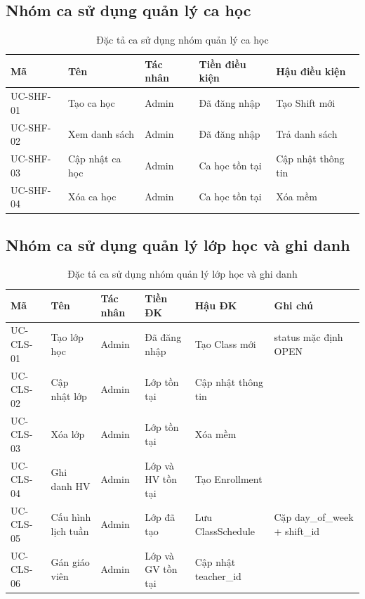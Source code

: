 \documentclass[../DoAn.tex]{subfiles}
\begin{document}
\subsection{Nhóm ca sử dụng quản lý ca học}

\begin{table}[H]
\centering
\caption{Đặc tả ca sử dụng nhóm quản lý ca học}
\label{table:bang2.9}
\begin{tabular}{|l|p{3cm}|l|p{2.5cm}|p{3cm}|}
\hline
\textbf{Mã} & \textbf{Tên} & \textbf{Tác nhân} & \textbf{Tiền điều kiện} & \textbf{Hậu điều kiện} \\ \hline
UC-SHF-01 & Tạo ca học & Admin & Đã đăng nhập & Tạo Shift mới \\ \hline
UC-SHF-02 & Xem danh sách & Admin & Đã đăng nhập & Trả danh sách \\ \hline
UC-SHF-03 & Cập nhật ca học & Admin & Ca học tồn tại & Cập nhật thông tin \\ \hline
UC-SHF-04 & Xóa ca học & Admin & Ca học tồn tại & Xóa mềm \\ \hline
\end{tabular}
\end{table}

\subsection{Nhóm ca sử dụng quản lý lớp học và ghi danh}

\begin{table}[H]
\centering
\caption{Đặc tả ca sử dụng nhóm quản lý lớp học và ghi danh}
\label{table:bang2.10}
\scriptsize
\begin{tabular}{|l|p{2.5cm}|l|p{2.5cm}|p{2.5cm}|p{2cm}|}
\hline
\textbf{Mã} & \textbf{Tên} & \textbf{Tác nhân} & \textbf{Tiền ĐK} & \textbf{Hậu ĐK} & \textbf{Ghi chú} \\ \hline
UC-CLS-01 & Tạo lớp học & Admin & Đã đăng nhập & Tạo Class mới & status mặc định OPEN \\ \hline
UC-CLS-02 & Cập nhật lớp & Admin & Lớp tồn tại & Cập nhật thông tin &  \\ \hline
UC-CLS-03 & Xóa lớp & Admin & Lớp tồn tại & Xóa mềm &  \\ \hline
UC-CLS-04 & Ghi danh HV & Admin & Lớp và HV tồn tại & Tạo Enrollment &  \\ \hline
UC-CLS-05 & Cấu hình lịch tuần & Admin & Lớp đã tạo & Lưu ClassSchedule & Cặp day\_of\_week + shift\_id \\ \hline
UC-CLS-06 & Gán giáo viên & Admin & Lớp và GV tồn tại & Cập nhật teacher\_id &  \\ \hline
\end{tabular}
\end{table}
\end{document}
